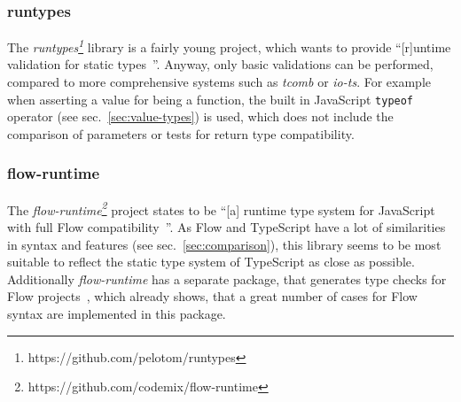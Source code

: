 \subsubsection{runtypes}

The \emph{runtypes\footnote{https://github.com/pelotom/runtypes}} library is a fairly young project, which wants to provide ``[r]untime validation for static types~\cite{RuntimeTypeSystem:runtypes}''. Anyway, only basic validations can be performed, compared to more comprehensive systems such as \emph{tcomb} or \emph{io-ts}. For example when asserting a value for being a function, the built in JavaScript \texttt{typeof} operator (see sec.~\ref{sec:value-types}) is used, which does not include the comparison of parameters or tests for return type compatibility.

\subsubsection{flow-runtime}

The \emph{flow-runtime\footnote{https://github.com/codemix/flow-runtime}} project states to be ``[a] runtime type system for JavaScript with full Flow compatibility~\cite{RuntimeTypeSystem:flow-runtime:lib}''. As Flow and TypeScript have a lot of similarities in syntax and features (see sec.~\ref{sec:comparison}), this library seems to be most suitable to reflect the static type system of TypeScript as close as possible. Additionally \emph{flow-runtime} has a separate package, that generates type checks for Flow projects~\cite{RuntimeTypeSystem:flow-runtime:babel}, which already shows, that a great number of cases for Flow syntax are implemented in this package.





